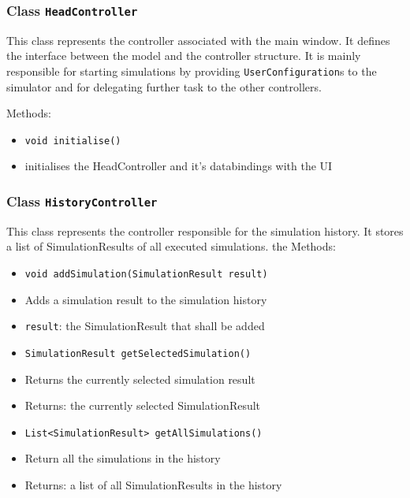 \documentclass[parskip=full,11pt]{scrartcl}
\begin{document}

\subsubsection{Class \texttt{HeadController}}
This class represents the controller associated with the main window. It defines the interface between the model and the controller structure. It is mainly responsible for starting simulations by providing \texttt{UserConfiguration}s to the simulator and for delegating further task to the other controllers.

Methods:
\begin{itemize}\itemsep -10pt
\item \texttt{void initialise()}
\item[] initialises the HeadController and it's databindings with the UI
\end{itemize}

\subsubsection{Class \texttt{HistoryController}}
This class represents the controller responsible for the simulation history. It stores a list of SimulationResults of all executed simulations.
the
Methods:
\begin{itemize}\itemsep -10pt
\item \texttt{void addSimulation(SimulationResult result)}
\item[] Adds a simulation result to the simulation history
\item[] \texttt{result}: the SimulationResult that shall be added

\item \texttt{SimulationResult getSelectedSimulation()}
\item[] Returns the currently selected simulation result
\item[] Returns: the currently selected SimulationResult

\item \texttt{List<SimulationResult> getAllSimulations()}
\item[] Return all the simulations in the history
\item[] Returns: a list of all SimulationResults in the history
\end{itemize}
\end{document}
